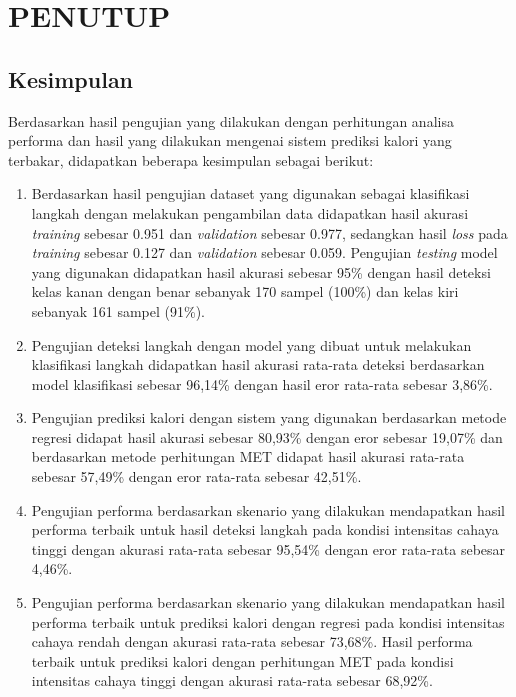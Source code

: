 \chapter{PENUTUP}
\label{chap:penutup}


\section{Kesimpulan}
\label{sec:kesimpulan}

Berdasarkan hasil pengujian yang dilakukan dengan perhitungan analisa performa dan hasil yang dilakukan mengenai sistem prediksi kalori yang terbakar, didapatkan beberapa kesimpulan sebagai berikut:

\begin{enumerate}[nolistsep]

  \item Berdasarkan hasil pengujian dataset yang digunakan sebagai klasifikasi langkah dengan melakukan pengambilan data didapatkan hasil akurasi \emph{training} sebesar 0.951 dan \emph{validation} sebesar 0.977, sedangkan hasil \emph{loss} pada \emph{training} sebesar 0.127 dan \emph{validation} sebesar 0.059. Pengujian \emph{testing} model yang digunakan didapatkan hasil akurasi sebesar 95\% dengan hasil deteksi kelas kanan dengan benar sebanyak 170 sampel (100\%) dan kelas kiri sebanyak 161 sampel (91\%).

  \item Pengujian deteksi langkah dengan model yang dibuat untuk melakukan klasifikasi langkah didapatkan hasil akurasi rata-rata deteksi berdasarkan model klasifikasi sebesar 96,14\% dengan hasil eror rata-rata sebesar 3,86\%.
  
  \item Pengujian prediksi kalori dengan sistem yang digunakan berdasarkan metode regresi didapat hasil akurasi sebesar 80,93\% dengan eror sebesar 19,07\% dan berdasarkan metode perhitungan MET didapat hasil akurasi rata-rata sebesar 57,49\% dengan eror rata-rata sebesar 42,51\%.
  
  \item Pengujian performa berdasarkan skenario yang dilakukan mendapatkan hasil performa terbaik untuk hasil deteksi langkah pada kondisi intensitas cahaya tinggi dengan akurasi rata-rata sebesar 95,54\% dengan eror rata-rata sebesar 4,46\%.
  
  \item Pengujian performa berdasarkan skenario yang dilakukan mendapatkan hasil performa terbaik untuk prediksi kalori dengan regresi pada kondisi intensitas cahaya rendah dengan akurasi rata-rata sebesar 73,68\%. Hasil performa terbaik untuk prediksi kalori dengan perhitungan MET pada kondisi intensitas cahaya tinggi dengan akurasi rata-rata sebesar 68,92\%.
  

\end{enumerate}
